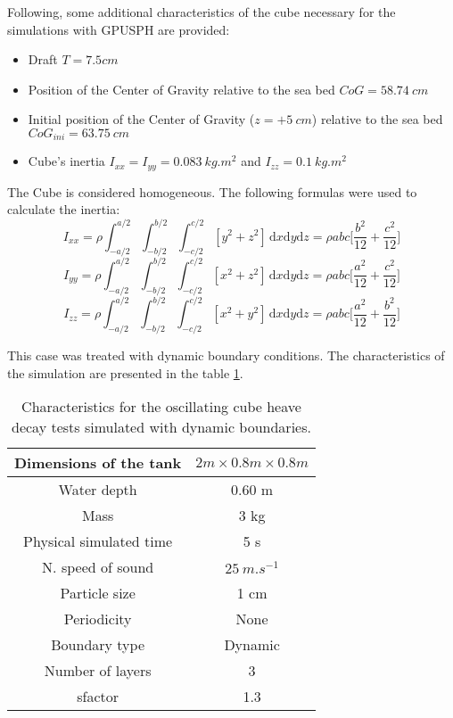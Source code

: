 \documentclass{../GPUSPHtemplate}
\begin{document}
Following, some additional characteristics of the cube necessary for the simulations with GPUSPH are provided:
\begin{itemize}
  \item Draft $T = 7.5 cm$
  \item Position of the Center of Gravity relative to the sea bed $CoG = 58.74\ cm$ 
  \item Initial position of the Center of Gravity ($z = +5\ cm$) relative to the sea bed $CoG_{ini} = 63.75\ cm$
  \item Cube's inertia $I_{xx} = I_{yy} = 0.083\ kg.m^2$ and $I_{zz} = 0.1\ kg.m^2$
\end{itemize}

The Cube is considered homogeneous. The following formulas were used to calculate the inertia:
\begin{equation}
I_{xx} = \rho \int_{-a/2}^{a/2} \int_{-b/2}^{b/2} \int_{-c/2}^{c/2} [y^2 + z^2]  \, \mathrm dx\mathrm dy\mathrm dz = \rho abc \bigg[\frac{b^2}{12} + \frac{c^2}{12}\bigg]
\end{equation}
\begin{equation}
I_{yy} = \rho \int_{-a/2}^{a/2} \int_{-b/2}^{b/2} \int_{-c/2}^{c/2} [x^2 + z^2]  \, \mathrm dx\mathrm dy\mathrm dz = \rho abc \bigg[\frac{a^2}{12} + \frac{c^2}{12}\bigg]
\end{equation}
\begin{equation}
I_{zz} = \rho \int_{-a/2}^{a/2} \int_{-b/2}^{b/2} \int_{-c/2}^{c/2} [x^2 + y^2]  \, \mathrm dx\mathrm dy\mathrm dz = \rho abc \bigg[\frac{a^2}{12} + \frac{b^2}{12}\bigg]
\end{equation}

This case was treated with dynamic boundary conditions. The characteristics of the simulation are presented in the table \ref{table:CubeDYN}.

\begin{table}[H]
\centering
\begin{tabular}{ c|c} 
\hline
Dimensions of the tank & $2m \times 0.8m \times 0.8m$  \\
\hline
Water depth & 0.60 m \\
\hline
Mass & 3 kg \\
\hline
Physical simulated time & 5 s \\
\hline
N. speed of sound & $25\ m.s^{-1}$ \\
\hline
Particle size & 1 cm \\
\hline
Periodicity & None \\
\hline
Boundary type & Dynamic \\
\hline
Number of layers & 3 \\
\hline
sfactor & 1.3 \\
\hline
\end{tabular}
\caption{Characteristics for the oscillating cube heave decay tests simulated with dynamic boundaries.}
\label{table:CubeDYN}
\end{table}
\end{document}

